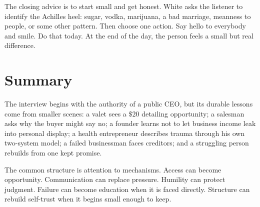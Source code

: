 The closing advice is to start small and get honest. White asks the listener to identify the Achilles heel: sugar, vodka, marijuana, a bad marriage, meanness to people, or some other pattern. Then choose one action. Say hello to everybody and smile. Do that today. At the end of the day, the person feels a small but real difference.

\section{Summary}

The interview begins with the authority of a public CEO, but its durable lessons come from smaller scenes: a valet sees a \(\$20\) detailing opportunity; a salesman asks why the buyer might say no; a founder learns not to let business income leak into personal display; a health entrepreneur describes trauma through his own two-system model; a failed businessman faces creditors; and a struggling person rebuilds from one kept promise.

The common structure is attention to mechanisms. Access can become opportunity. Communication can replace pressure. Humility can protect judgment. Failure can become education when it is faced directly. Structure can rebuild self-trust when it begins small enough to keep.